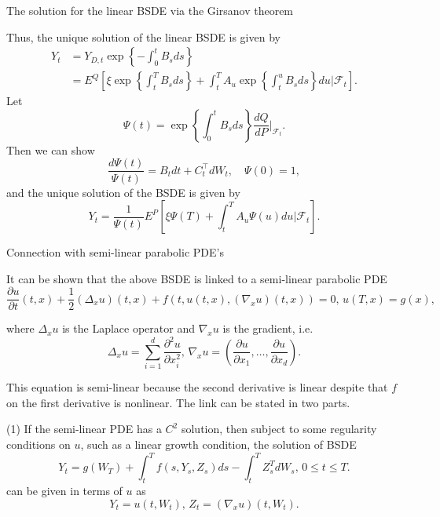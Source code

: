 \documentclass{beamer}
\begin{document}
\begin{frame}{The solution for the linear BSDE via the Girsanov theorem}

    {\footnotesize \footnotesize
     Thus, the unique solution of the linear BSDE is given by
     \begin{align*}
        Y_t &= Y_{D,t} \exp \left\{ -\int_0^t B_s ds \right\}\\
        &= E^Q \left[ \xi \exp \left\{ \int_t^T B_s ds \right\} 
+ \int_t^T A_u \exp \left\{ \int_t^u B_s ds \right\} du |\mathcal{F}_t \right].
     \end{align*}
 \pause Let
\[
\Psi(t) = \exp \left\{ \int_0^t B_s ds \right\} \frac{dQ}{dP} \Big|_{\mathcal{F}_t}.
\]
Then we can show 
\[
\frac{d\Psi(t)}{\Psi(t)} = B_t dt + C_t^\top dW_t, \quad \Psi(0) = 1,
\]
and the unique solution of the BSDE is given by
\[
Y_t = \frac{1}{\Psi(t)} E^P \left[ \xi \Psi(T) + \int_t^T A_u \Psi(u) du |\mathcal{F}_t \right].
\]

    }
    
\end{frame}
\begin{frame}{Connection with semi-linear parabolic PDE's}

    {\footnotesize \footnotesize
      It can be shown that the above BSDE is linked to a semi-linear parabolic PDE  
\[
\frac{\partial u}{\partial t}(t,x) + \frac{1}{2}(\Delta_x u)(t,x)
 + f(t,u(t,x),(\nabla_x u)(t,x)) = 0, \, u(T,x) = g(x),
\]

where \(\Delta_x u\) is the Laplace operator and \(\nabla_x u\) is the gradient, i.e.
\[
\Delta_x u = \sum_{i=1}^d \frac{\partial^2 u}{\partial x_i^2}, \, \nabla_x u 
= \left( \frac{\partial u}{\partial x_1}, \ldots, \frac{\partial u}{\partial x_d} \right).
\]

\par  \pause This equation is semi-linear because the second derivative is linear despite 
that \(f\) on the first derivative is nonlinear. The link can be stated in two parts.
\vspace{1em}
\par (1) If the semi-linear PDE has a \(C^2\) solution, then subject to some regularity conditions on \(u\), such as a linear growth condition, the solution of BSDE  
\[
Y_t = g(W_T) + \int_t^T f(s,Y_s,Z_s)ds - \int_t^T Z_s^T dW_s, \, 0 \leq t \leq T.
\]
can be given in terms of \(u\) as  
\[
Y_t = u(t,W_t), \, Z_t = (\nabla_x u)(t,W_t).
\]
    }
    
\end{frame}
\end{document}
